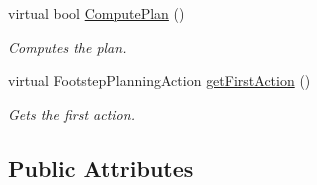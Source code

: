 \begin{DoxyCompactItemize}
\item 
virtual bool \hyperlink{class_planner_a9d3ca9d667c8330d241fcc61d5b2e8f5}{Compute\-Plan} ()
\begin{DoxyCompactList}\small\item\em Computes the plan. \end{DoxyCompactList}\item 
virtual Footstep\-Planning\-Action \hyperlink{class_planner_a599560668fe905b64d30794632169945}{get\-First\-Action} ()
\begin{DoxyCompactList}\small\item\em Gets the first action. \end{DoxyCompactList}\end{DoxyCompactItemize}
\subsection*{Public Attributes}
